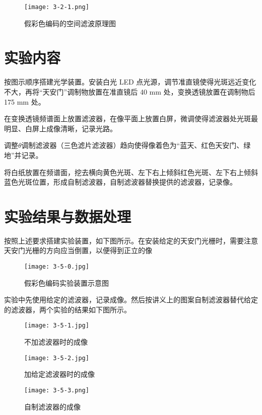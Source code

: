 \documentclass[12pt]{article}
\begin{document}
\begin{figure}[htbp]
    \centering
    \texttt{[image: 3-2-1.png]}
    \caption{假彩色编码的空间滤波原理图}
\end{figure}

\section{实验内容}
按图示顺序搭建光学装置。安装白光 LED 点光源，调节准直镜使得光斑远近变化不大，再将“天安门”调制物放置在准直镜后 40 mm 处，变换透镜放置在调制物后 175 mm 处。

在变换透镜频谱面上放置滤波器，在像平面上放置白屏，微调使得滤波器处光斑最明显、白屏上成像清晰，记录光路。

调整$\theta$调制滤波器（三色滤片滤波器）趋向使得像着色为“蓝天、红色天安门、绿地”并记录。

将白纸放置在频谱面，挖去横向黄色光斑、左下右上倾斜红色光斑、左下右上倾斜蓝色光斑位置，形成自制滤波器，自制滤波器替换提供的滤波器，记录像。

\section{实验结果与数据处理}
按照上述要求搭建实验装置，如下图所示。在安装给定的天安门光栅时，需要注意天安门光栅的方向应当倒置，以便得到正立的像

\begin{figure}[htbp]
    \centering
    \texttt{[image: 3-5-0.jpg]}
    \caption{假彩色编码实验装置示意图}
\end{figure}

实验中先使用给定的滤波器，记录成像。然后按讲义上的图案自制滤波器替代给定的滤波器，两个实验的结果如下图所示。

\begin{figure}[htbp]
    \centering
    \begin{minipage}[c]{0.4\textwidth}
        \centering
        \texttt{[image: 3-5-1.jpg]}
        \caption{不加滤波器时的成像}
    \end{minipage}
    \qquad\qquad
    \begin{minipage}[c]{0.4\textwidth}
        \centering
        \texttt{[image: 3-5-2.jpg]}
        \caption{加给定滤波器时的成像}
    \end{minipage}
\end{figure}

\begin{figure}[htbp]
    \centering
    \texttt{[image: 3-5-3.png]}
    \caption{自制滤波器的成像}
\end{figure}
\end{document}
